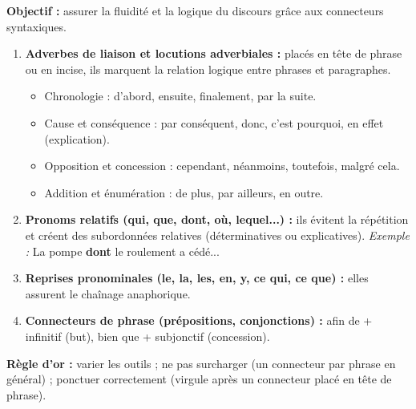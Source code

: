 \documentclass[11pt]{article}
\newcommand{\cle}[1]{{\popxbold\color{popdark}#1}}
\begin{document}
\begin{methode}
    \textbf{Objectif :} assurer la fluidité et la logique du discours grâce aux connecteurs syntaxiques.
    \begin{enumerate}
        \item \textbf{Adverbes de liaison et locutions adverbiales :} placés en tête de phrase ou en incise, ils marquent la relation logique entre phrases et paragraphes.
        \begin{itemize}
            \item \cle{Chronologie :} \og d'abord\fg, \og ensuite\fg, \og finalement\fg, \og par la suite\fg.
            \item \cle{Cause et conséquence :} \og par conséquent\fg, \og donc\fg, \og c'est pourquoi\fg, \og en effet\fg{} (explication).
            \item \cle{Opposition et concession :} \og cependant\fg, \og néanmoins\fg, \og toutefois\fg, \og malgré cela\fg.
            \item \cle{Addition et énumération :} \og de plus\fg, \og par ailleurs\fg, \og en outre\fg.
        \end{itemize}
        \item \textbf{Pronoms relatifs (qui, que, dont, où, lequel...) :} ils évitent la répétition et créent des \cle{subordonnées relatives} (déterminatives ou explicatives). \emph{Exemple :} \og La pompe \textbf{dont} le roulement a cédé...\fg
        \item \textbf{Reprises pronominales (le, la, les, en, y, ce qui, ce que) :} elles assurent le chaînage anaphorique.
        \item \textbf{Connecteurs de phrase (prépositions, conjonctions) :} \og afin de\fg{} + infinitif (but), \og bien que\fg{} + subjonctif (concession).
    \end{enumerate}
    \textbf{Règle d'or :} varier les outils ; ne pas surcharger (un connecteur par phrase en général) ; ponctuer correctement (virgule après un connecteur placé en tête de phrase).
\end{methode}
\end{document}
